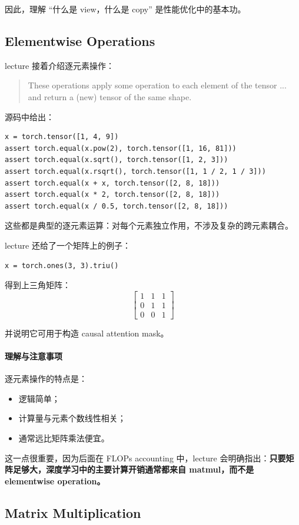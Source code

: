 \documentclass[a4paper,UTF8]{article}
\numberwithin{equation}{section}
\begin{document}
因此，理解 ``什么是 view，什么是 copy'' 是性能优化中的基本功。

\subsection{Elementwise Operations}

lecture 接着介绍逐元素操作：
\begin{quote}
These operations apply some operation to each element of the tensor ... and return a (new) tensor of the same shape.
\end{quote}

源码中给出：
\begin{verbatim}
x = torch.tensor([1, 4, 9])
assert torch.equal(x.pow(2), torch.tensor([1, 16, 81]))
assert torch.equal(x.sqrt(), torch.tensor([1, 2, 3]))
assert torch.equal(x.rsqrt(), torch.tensor([1, 1 / 2, 1 / 3]))
assert torch.equal(x + x, torch.tensor([2, 8, 18]))
assert torch.equal(x * 2, torch.tensor([2, 8, 18]))
assert torch.equal(x / 0.5, torch.tensor([2, 8, 18]))
\end{verbatim}

这些都是典型的逐元素运算：对每个元素独立作用，不涉及复杂的跨元素耦合。

lecture 还给了一个矩阵上的例子：
\begin{verbatim}
x = torch.ones(3, 3).triu()
\end{verbatim}
得到上三角矩阵：
\[
\begin{bmatrix}
1 & 1 & 1 \\
0 & 1 & 1 \\
0 & 0 & 1
\end{bmatrix}
\]

并说明它可用于构造 causal attention mask。

\paragraph{理解与注意事项}
逐元素操作的特点是：
\begin{itemize}
    \item 逻辑简单；
    \item 计算量与元素个数线性相关；
    \item 通常远比矩阵乘法便宜。
\end{itemize}

这一点很重要，因为后面在 FLOPs accounting 中，lecture 会明确指出：\textbf{只要矩阵足够大，深度学习中的主要计算开销通常都来自 matmul，而不是 elementwise operation。}

\subsection{Matrix Multiplication}
\end{document}

